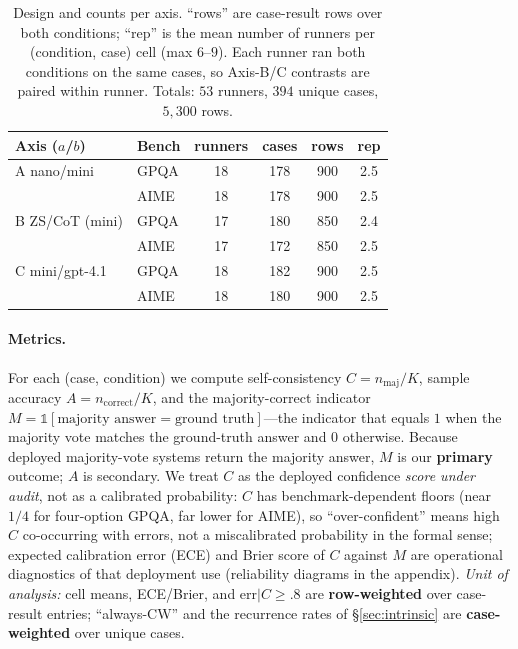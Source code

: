 \documentclass[11pt]{article}
\newcommand{\C}{\textit{C}}
\newcommand{\A}{\textit{A}}
\newcommand{\Mlab}{\textit{M}}
\begin{document}
\begin{table}[t]
\centering\footnotesize
\setlength{\tabcolsep}{4pt}
\begin{tabular}{@{}llcccc@{}}
\toprule
Axis ($a$/$b$) & Bench & runners & cases & rows & rep \\
\midrule
A nano/mini       & GPQA & 18 & 178 & 900 & 2.5 \\
                  & AIME & 18 & 178 & 900 & 2.5 \\
B ZS/CoT (mini)   & GPQA & 17 & 180 & 850 & 2.4 \\
                  & AIME & 17 & 172 & 850 & 2.5 \\
C mini/gpt-4.1    & GPQA & 18 & 182 & 900 & 2.5 \\
                  & AIME & 18 & 180 & 900 & 2.5 \\
\bottomrule
\end{tabular}
\caption{Design and counts per axis. ``rows'' are case-result rows over both conditions; ``rep'' is the
mean number of runners per (condition, case) cell (max $6$--$9$). Each runner ran both conditions on the
same cases, so Axis-B/C contrasts are paired within runner. Totals: $53$ runners, $394$ unique cases,
$5{,}300$ rows.}
\label{tab:design}
\end{table}

\paragraph{Metrics.} For each (case, condition) we compute self-consistency
$\C=n_{\text{maj}}/K$, sample accuracy $\A=n_{\text{correct}}/K$, and the majority-correct
indicator $\Mlab=\mathbb{1}[\text{majority answer}=\text{ground truth}]$---the indicator that equals $1$ when the majority vote matches the ground-truth answer and $0$ otherwise. Because deployed
majority-vote systems return the majority answer, $\Mlab$ is our \textbf{primary} outcome; $\A$ is
secondary. We treat $\C$ as the deployed confidence \emph{score under audit}, not as a calibrated
probability: $\C$ has benchmark-dependent floors (near $1/4$ for four-option GPQA, far lower for AIME),
so ``over-confident'' means high $\C$ co-occurring with errors, not a miscalibrated probability in the
formal sense; expected calibration error (ECE) and Brier score of $\C$ against $\Mlab$ are operational diagnostics of that deployment use
(reliability diagrams in the appendix). \emph{Unit of analysis:} cell means, ECE/Brier, and
err$\mid\C{\geq}.8$ are \textbf{row-weighted} over case-result entries; ``always-CW'' and the
recurrence rates of \S\ref{sec:intrinsic} are \textbf{case-weighted} over unique cases.
\end{document}
